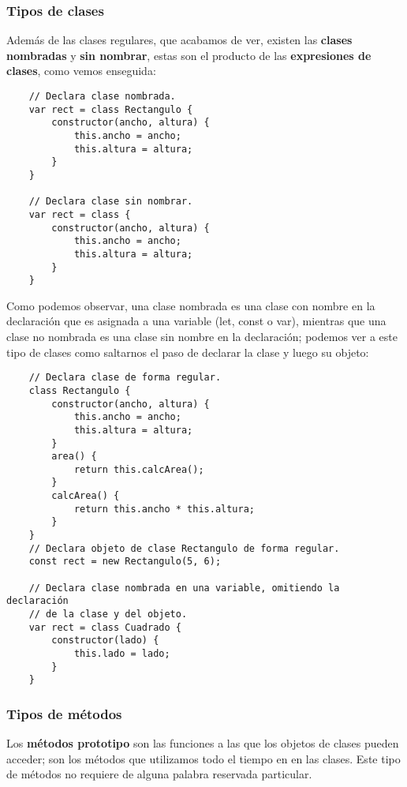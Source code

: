 \subsubsection{Tipos de clases}

Además de las clases regulares, que acabamos de ver, existen las \textbf{clases nombradas} y \textbf{sin nombrar}, estas son el producto de las \textbf{expresiones de clases}, como vemos enseguida:
\begin{lstlisting}
    // Declara clase nombrada.
    var rect = class Rectangulo {
        constructor(ancho, altura) {
            this.ancho = ancho;
            this.altura = altura;
        }
    }

    // Declara clase sin nombrar.
    var rect = class {
        constructor(ancho, altura) {
            this.ancho = ancho;
            this.altura = altura;
        }
    }
\end{lstlisting}

Como podemos observar, una clase nombrada es una clase con nombre en la declaración que es asignada a una variable (let, const o var), mientras que una clase no nombrada es una clase sin nombre en la declaración; podemos ver a este tipo de clases como saltarnos el paso de declarar la clase y luego su objeto:
\begin{lstlisting}
    // Declara clase de forma regular.
    class Rectangulo {
        constructor(ancho, altura) {
            this.ancho = ancho;
            this.altura = altura;
        }
        area() {
            return this.calcArea();
        }
        calcArea() {
            return this.ancho * this.altura;
        }
    }
    // Declara objeto de clase Rectangulo de forma regular.
    const rect = new Rectangulo(5, 6);

    // Declara clase nombrada en una variable, omitiendo la declaración
    // de la clase y del objeto.
    var rect = class Cuadrado {
        constructor(lado) {
            this.lado = lado;
        }
    }
\end{lstlisting}


\subsubsection{Tipos de métodos}

Los \textbf{métodos prototipo} son las funciones a las que los objetos de clases pueden acceder; son los métodos que utilizamos todo el tiempo en en las clases. Este tipo de métodos no requiere de alguna palabra reservada particular.

